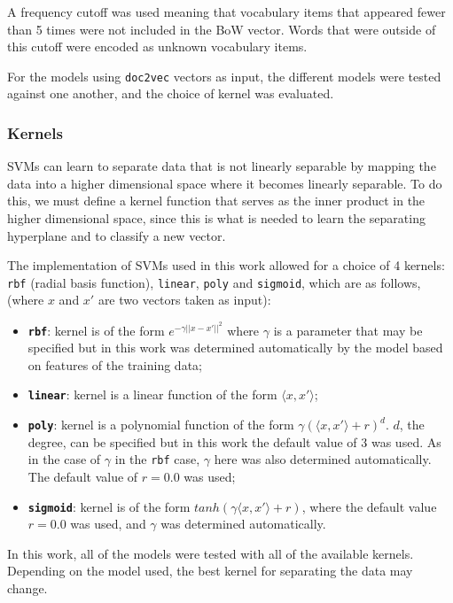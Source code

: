 \documentclass[twocolumn]{article}
\begin{document}
A frequency cutoff was used meaning that vocabulary items that appeared fewer than 5 times were not included in the BoW vector. Words that were outside of this cutoff were encoded as unknown vocabulary items.

For the models using \texttt{doc2vec} vectors as input, the different models were tested against one another, and the choice of kernel was evaluated.

\subsubsection{Kernels}

SVMs can learn to separate data that is not linearly separable by mapping the data into a higher dimensional space where it becomes linearly separable. To do this, we must define a kernel function that serves as the inner product in the higher dimensional space, since this is what is needed to learn the separating hyperplane and to classify a new vector.

The implementation of SVMs used in this work allowed for a choice of 4 kernels: \texttt{rbf} (radial basis function), \texttt{linear}, \texttt{poly} and \texttt{sigmoid}, which are as follows, (where $x$ and $x'$ are two vectors taken as input):

\begin{itemize}
	\item \textbf{\texttt{rbf}}: kernel is of the form $e^{-\gamma||x-x'||^2}$ where $\gamma$ is a parameter that may be specified but in this work was determined automatically by the model based on features of the training data;
	\item \textbf{\texttt{linear}}: kernel is a linear function of the form $\langle x, x' \rangle$;
	\item \textbf{\texttt{poly}}: kernel is a polynomial function of the form $\gamma(\langle x, x' \rangle + r)^d$. $d$, the degree, can be specified but in this work the default value of 3 was used. As in the case of $\gamma$ in the \texttt{rbf} case, $\gamma$ here was also determined automatically. The default value of $r=0.0$ was used;
	\item \textbf{\texttt{sigmoid}}: kernel is of the form $tanh(\gamma \langle x, x' \rangle + r)$, where the default value $r=0.0$ was used, and $\gamma$ was determined automatically.
\end{itemize}

In this work, all of the models were tested with all of the available kernels. Depending on the model used, the best kernel for separating the data may change.
\end{document}
